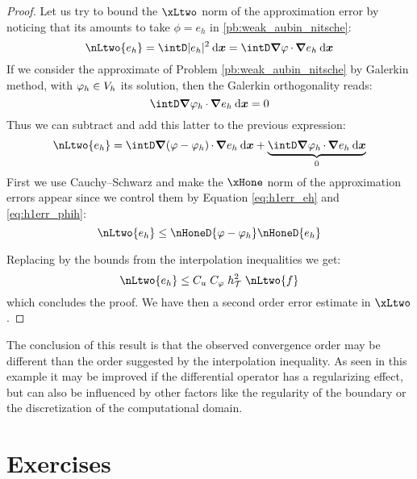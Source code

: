 \begin{proof}
\medskip
Let us try to bound the $\xLtwo$ norm of the approximation error by noticing that its amounts to take $\phi = e_h$ in \eqref{pb:weak_aubin_nitsche}:
\begin{equation*}
\nLtwo{e_h} = \intD |e_h|^2 \dxx = \intD \Grad \varphi\xDot \Grad e_h\dxx
\end{equation*}
If we consider the approximate of Problem \eqref{pb:weak_aubin_nitsche} by Galerkin method, with $\varphi_h \in {{V}}_h$ its solution, then the Galerkin orthogonality reads:
\begin{equation*}
\intD \Grad \varphi_h\xDot \Grad e_h\dxx  = 0
\end{equation*}
Thus we can subtract and add this latter to the previous expression:
\begin{equation*}
\nLtwo{e_h} = \intD \Grad (\varphi - \varphi_h)\xDot \Grad e_h\dxx + \underbrace{\intD \Grad \varphi_h\xDot \Grad e_h\dxx}_{0}
\end{equation*}
First we use Cauchy--Schwarz and make the $\xHone$ norm of the approximation errors appear since we control them by Equation \eqref{eq:h1err_eh} and \eqref{eq:h1err_phih}:
\begin{equation*}
\nLtwo{e_h} \leq \nHoneD{\varphi - \varphi_h} \nHoneD{e_h}
\end{equation*}

\medskip
Replacing by the bounds from the interpolation inequalities we get:
\begin{equation*}
\nLtwo{e_h} \leq C_u\;C_\varphi\;\sizeT^2\;\nLtwo{f}
\end{equation*}
which concludes the proof. We have then a second order error estimate in $\xLtwo$.
\end{proof}

The conclusion of this result is that the observed convergence order may be different than the order suggested by the interpolation inequality.
As seen in this example it may be improved if the differential operator has a regularizing effect, but can also be influenced by other factors like the regularity of the boundary or the discretization of the computational domain.

\newpage
\section{Exercises}


